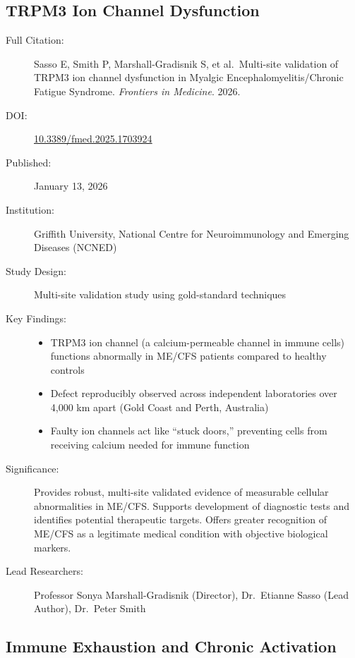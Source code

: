 \subsection{TRPM3 Ion Channel Dysfunction}

\begin{description}
    \item[Full Citation:] Sasso E, Smith P, Marshall-Gradisnik S, et al.\ Multi-site validation of TRPM3 ion channel dysfunction in Myalgic Encephalomyelitis/Chronic Fatigue Syndrome. \textit{Frontiers in Medicine}. 2026.
    \item[DOI:] \href{https://doi.org/10.3389/fmed.2025.1703924}{10.3389/fmed.2025.1703924}
    \item[Published:] January 13, 2026
    \item[Institution:] Griffith University, National Centre for Neuroimmunology and Emerging Diseases (NCNED)
    \item[Study Design:] Multi-site validation study using gold-standard techniques
    \item[Key Findings:]
    \begin{itemize}
        \item TRPM3 ion channel (a calcium-permeable channel in immune cells) functions abnormally in ME/CFS patients compared to healthy controls
        \item Defect reproducibly observed across independent laboratories over 4,000 km apart (Gold Coast and Perth, Australia)
        \item Faulty ion channels act like ``stuck doors,'' preventing cells from receiving calcium needed for immune function
    \end{itemize}
    \item[Significance:] Provides robust, multi-site validated evidence of measurable cellular abnormalities in ME/CFS. Supports development of diagnostic tests and identifies potential therapeutic targets. Offers greater recognition of ME/CFS as a legitimate medical condition with objective biological markers.
    \item[Lead Researchers:] Professor Sonya Marshall-Gradisnik (Director), Dr.\ Etianne Sasso (Lead Author), Dr.\ Peter Smith
\end{description}

\subsection{Immune Exhaustion and Chronic Activation}

